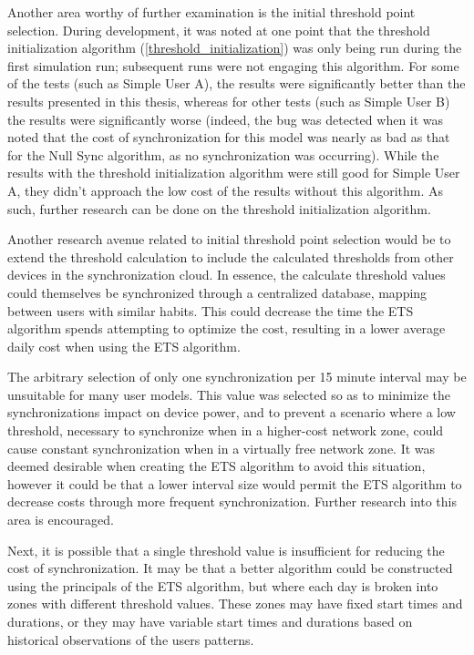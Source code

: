Another area worthy of further examination is the initial threshold point selection.  During development, it was noted at one point that the threshold initialization algorithm (\ref{threshold_initialization}) was only being run during the first simulation run; subsequent runs were not engaging this algorithm.  For some of the tests (such as Simple User A), the results were significantly better than the results presented in this thesis, whereas for other tests (such as Simple User B) the results were significantly worse (indeed, the bug was detected when it was noted that the cost of synchronization for this model was nearly as bad as that for the Null Sync algorithm, as no synchronization was occurring).  While the results with the threshold initialization algorithm were still good for Simple User A, they didn't approach the low cost of the results without this algorithm.  As such, further research can be done on the threshold initialization algorithm.

Another research avenue related to initial threshold point selection would be to extend the threshold calculation to include the calculated thresholds from other devices in the synchronization cloud. In essence, the calculate threshold values could themselves be synchronized through a centralized database, mapping between users with similar habits.  This could decrease the time the ETS algorithm spends attempting to optimize the cost, resulting in a lower average daily cost when using the ETS algorithm.

The arbitrary selection of only one synchronization per 15 minute interval may be unsuitable for many user models.  This value was selected so as to minimize the synchronizations impact on device power, and to prevent a scenario where a low threshold, necessary to synchronize when in a higher-cost network zone, could cause constant synchronization when in a virtually free network zone.  It was deemed desirable when creating the ETS algorithm to avoid this situation, however it could be that a lower interval size would permit the ETS algorithm to decrease costs through more frequent synchronization.  Further research into this area is encouraged.

Next, it is possible that a single threshold value is insufficient for reducing the cost of synchronization.  It may be that a better algorithm could be constructed using the principals of the ETS algorithm, but where each day is broken into zones with different threshold values.  These zones may have fixed start times and durations, or they may have variable start times and durations based on historical observations of the users patterns.

